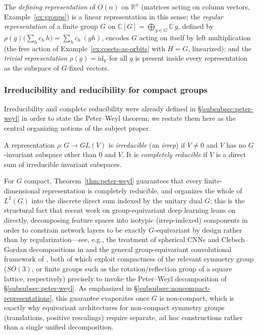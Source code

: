 \documentclass[mathematics,review,submit,moreauthors]{Definitions/mdpi}
\begin{document}
\begin{Example}
\label{ex:representations-recap}
The \emph{defining representation} of $O(n)$ on $\mathbb{R}^n$ (matrices
acting on column vectors, Example~\ref{ex:groups}) is a linear
representation in this sense; the \emph{regular representation} of a finite
group $G$ on $\mathbb{C}[G] = \bigoplus_{g \in G} \mathbb{C}\, g$, defined by
$\rho(g)\bigl(\sum_h c_h\, h\bigr) = \sum_h c_h\,(gh)$, encodes $G$ acting on
itself by left multiplication (the free action of
Example~\ref{ex:cosets-as-orbits} with $H = G$, linearized); and the
\emph{trivial representation} $\rho(g) = \mathrm{id}_V$ for all $g$ is
present inside every representation as the subspace of $G$-fixed vectors.
\end{Example}

\subsubsection{Irreducibility and reducibility for compact groups}
\label{subsubsec:irreps-recap}

Irreducibility and complete reducibility were already defined in
\S\ref{subsubsec:peter-weyl} in order to state the Peter--Weyl theorem; we
restate them here as the central organizing notions of the subject proper.

\begin{Definition}
\label{def:irrep}
A representation $\rho : G \to GL(V)$ is \emph{irreducible} (an
\emph{irrep}) if $V \neq 0$ and $V$ has no $G$-invariant subspace other than
$0$ and $V$. It is \emph{completely reducible} if $V$ is a direct sum of
irreducible invariant subspaces.
\end{Definition}

For $G$ compact, Theorem~\ref{thm:peter-weyl} guarantees that every
finite-dimensional representation is completely reducible, and organizes the
whole of $L^2(G)$ into the discrete direct sum indexed by the unitary dual
$\widehat{G}$; this is the structural fact that recent work on
group-equivariant deep learning leans on directly, decomposing feature
spaces into isotypic (irrep-indexed) components in order to constrain
network layers to be exactly $G$-equivariant by design rather than by
regularization---see, e.g., the treatment of spherical CNNs and Clebsch--Gordan
decompositions in \cite{kondor2018p3icml} and the general group-equivariant
convolutional framework of \cite{cohen2014}, both of which exploit
compactness of the relevant symmetry group ($SO(3)$, or finite groups such as
the rotation/reflection group of a square lattice, respectively) precisely
to invoke the Peter--Weyl decomposition of \S\ref{subsubsec:peter-weyl}. As
emphasized in \S\ref{subsubsec:noncompact-representations}, this guarantee
evaporates once $G$ is non-compact, which is exactly why equivariant
architectures for non-compact symmetry groups (translations, positive
rescalings) require separate, ad hoc constructions rather than a single
unified decomposition.
\end{document}
